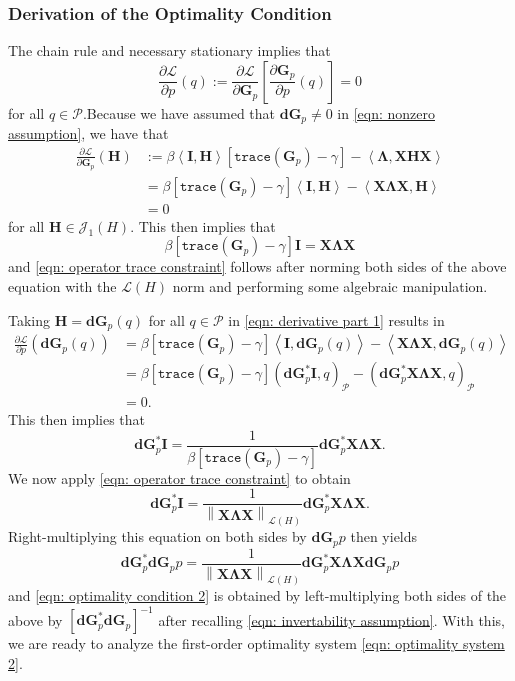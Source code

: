 \documentclass{amsart}
\newcommand{\sL}{\mathscr L}
\newcommand{\sJ}{\mathscr J}
\newcommand{\p}[1]{\left( {#1} \right)}
\newcommand{\norm}[1]{\left\| #1 \right\|}
\newcommand{\br}[1]{\left[ #1 \right]}
\newcommand{\dual}[1]{\left< #1 \right>}
\newcommand{\trace}[1]{\texttt{trace}\left( #1\right)}
\newcommand{\sP}{\mathcal{P}}
\newcommand{\bX}{\mathbf X}
\newcommand{\bG}{\mathbf G}
\newcommand{\bLambda}{\boldsymbol{\Lambda}}
\newcommand{\bd}{\mathbf d}
\begin{document}
\subsubsection{Derivation of the Optimality Condition}
The chain rule and necessary stationary implies that
$$
\frac{\partial \mathcal L}{\partial p}(q) := \frac{\partial \mathcal L}{\partial \bG_p}\br{\frac{\partial \bG_p}{\partial p}(q)} = 0
$$
for all $q \in \sP$.Because we have assumed that $\bd\bG_p \neq 0$ in \eqref{eqn: nonzero assumption}, we have that 
\begin{equation}
\label{eqn: derivative part 1}
\begin{aligned}
    \frac{\partial \mathcal L}{\partial \bG_p}(\mathbf H) &:= \beta\dual{\mathbf I, \mathbf H} \br{\trace{\bG_p} - \gamma} - \dual{\bLambda , \bX\mathbf H \bX} \\
    &=\beta[\trace{\bG_p}-\gamma]\dual{\mathbf I, \mathbf H} - \dual{\bX\bLambda\bX,\mathbf H} \\
    &= 0
\end{aligned}
\end{equation}
for all $\mathbf H \in \sJ_1(H)$. This then implies that 
$$
    \beta\br{\trace{\bG_p} - \gamma}\mathbf I = \bX\bLambda\bX
$$
and \eqref{eqn: operator trace constraint} follows after norming both sides of the above equation with the $\sL(H)$ norm and performing some algebraic manipulation. 

Taking $\mathbf H = \bd\bG_p(q)$ for all $q \in \sP$ in \eqref{eqn: derivative part 1} results in 
$$
\begin{aligned}
    \frac{\partial \mathcal L}{\partial p}(\bd\bG_p(q))
    &=\beta[\trace{\bG_p}-\gamma]\dual{\mathbf I, \bd\bG_p(q)} - \dual{\bX\bLambda\bX,\bd\bG_p(q)} \\
    &=\beta\br{\trace{\bG_p} - \gamma}
    \p{\bd\bG_p^*\mathbf I, q}_\sP -
    \p{\bd\bG_p^*\bX\bLambda\bX,q}_{\sP} \\
    &= 0.
\end{aligned}
$$
This then implies that
$$
    \bd\bG^*_p\mathbf I = \frac{1}{\beta\br{\trace{\bG_p} - \gamma}} \bd\bG_p^*\bX\bLambda\bX.
$$
We now apply \eqref{eqn: operator trace constraint} to obtain
$$
    \bd\bG^*_p\mathbf I = \frac{1}{\norm{\bX\bLambda\bX}_{\sL\p{H}}} \bd\bG_p^*\bX\bLambda\bX.
$$
Right-multiplying this equation on both sides by $\bd\bG_p p$ then yields
$$
    \bd\bG^*_p\bd\bG_pp = \frac{1}{\norm{\bX\bLambda\bX}_{\sL\p{H}}} \bd\bG_p^*\bX\bLambda\bX\bd\bG_pp
$$
and \eqref{eqn: optimality condition 2} is obtained by left-multiplying both sides of the above by $\br{\bd\bG^*_p\bd\bG_p}^{-1}$ after recalling \eqref{eqn: invertability assumption}. With this, we are ready to analyze the first-order optimality system \eqref{eqn: optimality system 2}.
\end{document}
